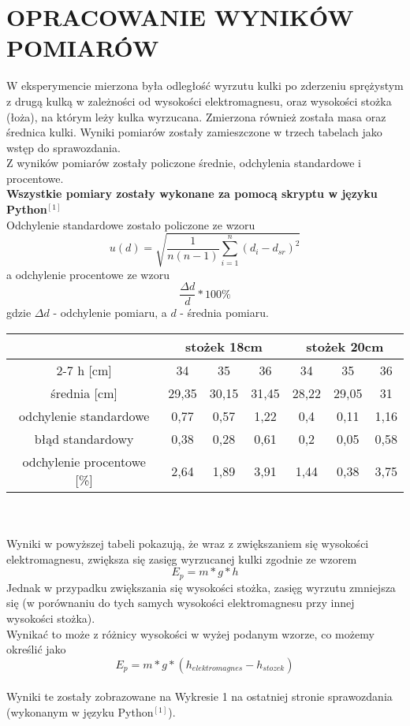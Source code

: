 \documentclass{article}
\begin{document}
\section*{OPRACOWANIE WYNIKÓW POMIARÓW}

{W eksperymencie mierzona była odległość wyrzutu kulki po zderzeniu sprężystym z drugą kulką w zależności od wysokości elektromagnesu, oraz wysokości stożka (łoża), na którym leży kulka wyrzucana. Zmierzona również została masa oraz średnica kulki. Wyniki pomiarów zostały zamieszczone w trzech tabelach jako wstęp do sprawozdania. \\
Z wyników pomiarów zostały policzone średnie, odchylenia standardowe i procentowe. \\
\textbf{Wszystkie pomiary zostały wykonane za pomocą skryptu w języku Python$^{[1]}$} \\
Odchylenie standardowe zostało policzone ze wzoru
\[u(d) = \sqrt{\frac{1}{n(n-1)}\sum^n_{i=1}(d_i-d_{sr})^2}\]
a odchylenie procentowe ze wzoru
\[\frac{\Delta d}{d}*100\%\]
gdzie $\Delta d$ - odchylenie pomiaru, a $d$ - średnia pomiaru. \\
\begin{tabular}{|c|c|c|c|c|c|c|}
\hline
\multirow{2}{*}{} & \multicolumn{3}{c|}{stożek 18cm} & \multicolumn{3}{c|}{stożek 20cm} \\ \cline{2-7}
h [cm] & 34 & 35 & 36 & 34 & 35 & 36 \\ \hline
średnia [cm] & 29,35 & 30,15 & 31,45 & 28,22 & 29,05 & 31 \\ \hline
odchylenie standardowe & 0,77 & 0,57 & 1,22 & 0,4 & 0,11 & 1,16 \\ \hline
błąd standardowy & 0,38 & 0,28 & 0,61 & 0,2 & 0,05 & 0,58 \\ \hline
odchylenie procentowe [\%] & 2,64 & 1,89 & 3,91 & 1,44 & 0,38 & 3,75 \\ \hline
\end{tabular} \\
\textbf{} \\
Wyniki w powyższej tabeli pokazują, że wraz z zwiększaniem się wysokości elektromagnesu, zwiększa się zasięg wyrzucanej kulki zgodnie ze wzorem
\[E_p=m*g*h\]
Jednak w przypadku zwiększania się wysokości stożka, zasięg wyrzutu zmniejsza się (w porównaniu do tych samych wysokości elektromagnesu przy innej wysokości stożka). \\
Wynikać to może z różnicy wysokości w wyżej podanym wzorze, co możemy określić jako
\[E_p = m*g*(h_{elektromagnes} - h_{stozek})\] \\
Wyniki te zostały zobrazowane na Wykresie 1 na ostatniej stronie sprawozdania (wykonanym w języku Python$^{[1]}$).}\\
\end{document}
